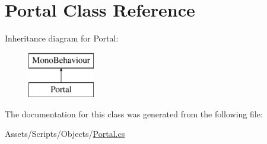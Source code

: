 \hypertarget{class_portal}{}\section{Portal Class Reference}
\label{class_portal}
Inheritance diagram for Portal\+:\begin{figure}[H]
\begin{center}
\leavevmode
\includegraphics[height=2.000000cm]{class_portal}
\end{center}
\end{figure}


The documentation for this class was generated from the following file\+:\begin{DoxyCompactItemize}
\item 
Assets/\+Scripts/\+Objects/\mbox{\hyperlink{_portal_8cs}{Portal.\+cs}}\end{DoxyCompactItemize}

